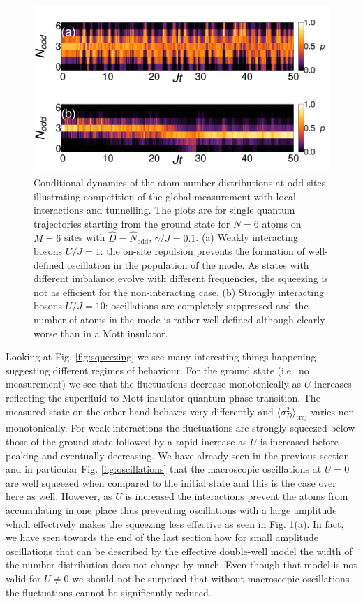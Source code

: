 \begin{figure}[htbp!]
  \centering
  \includegraphics[width=\textwidth]{panel_U}
  \caption[Trajectories in the presence of Interactions]{Conditional
    dynamics of the atom-number distributions at odd sites
    illustrating competition of the global measurement with local
    interactions and tunnelling. The plots are for single quantum
    trajectories starting from the ground state for $N = 6$ atoms on
    $M = 6$ sites with $\hat{D} = \hat{N}_\mathrm{odd}$,
    $\gamma/J = 0.1$. (a) Weakly interacting bosons $U/J = 1$: the
    on-site repulsion prevents the formation of well-defined
    oscillation in the population of the mode. As states with
    different imbalance evolve with different frequencies, the
    squeezing is not as efficient for the non-interacting case. (b)
    Strongly interacting bosons $U/J = 10$: oscillations are
    completely suppressed and the number of atoms in the mode is rather
    well-defined although clearly worse than in a Mott insulator.}
  \label{fig:Utraj}
\end{figure}

Looking at Fig. \ref{fig:squeezing} we see many interesting things
happening suggesting different regimes of behaviour. For the ground
state (i.e.~no measurement) we see that the fluctuations decrease
monotonically as $U$ increases reflecting the superfluid to Mott
insulator quantum phase transition. The measured state on the other
hand behaves very differently and
$\langle \sigma^2_D \rangle_\mathrm{traj}$ varies
non-monotonically. For weak interactions the fluctuations are strongly
squeezed below those of the ground state followed by a rapid increase
as $U$ is increased before peaking and eventually decreasing. We have
already seen in the previous section and in particular
Fig. \ref{fig:oscillations} that the macroscopic oscillations at
$U = 0$ are well squeezed when compared to the initial state and this
is the case over here as well. However, as $U$ is increased the
interactions prevent the atoms from accumulating in one place thus
preventing oscillations with a large amplitude which effectively makes
the squeezing less effective as seen in Fig. \ref{fig:Utraj}(a). In
fact, we have seen towards the end of the last section how for small
amplitude oscillations that can be described by the effective
double-well model the width of the number distribution does not change
by much. Even though that model is not valid for $U \ne 0$ we should
not be surprised that without macroscopic oscillations the
fluctuations cannot be significantly reduced.

